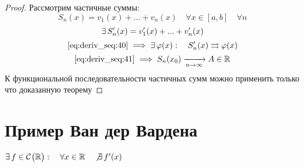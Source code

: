 \begin{proof}
	Рассмотрим частичные суммы:
	$$ S_n(x) = v_1(x) + ... + v_n(x) \quad \forall x \in [a, b] \quad \forall n $$
	$$ \exists\, S_n'(x) = v_1'(x) + ... + v_n'(x) $$
	$$ \eref{deriv_seq:40} \implies \exist \vphi(x) : \quad S_n'(x) \rightrightarrows \vphi(x) $$
	$$ \eref{deriv_seq:41} \implies S_n(x_0) \infarr{n} A \in \R $$
	К функциональной последовательности частичных сумм можно применить только что доказанную теорему
\end{proof}

\section{Пример Ван дер Вардена}

\begin{theorem}
	$ \exists\, f \in \mathcal{C}^{} \big( {\mathbb{R}} \big)  : \quad \forall x \in \mathbb{R} \quad \not\exists\, f'(x) $
\end{theorem}

